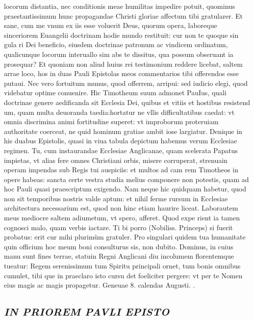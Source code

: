 \documentclass{article}
\begin{document}
\begin{pages}
locorum distantia, nec conditionis meae humilitas impedire potuit, quominus praestantissimum hunc propagandae Christi gloriae affectum tibi gratularer. Et sane, cum me vnum ex iis esse voluerit Deus, quorum opera, laboreque sinceriorem Euangelii doctrinam hodie mundo restituit: cur non te quoque sin gula ri Dei beneficio, eiusdem doctrinae patronum ac vindicem ordinatum, qualicunque locorum interuallo sim abs te dissitus, qua possum obseruant ia prosequar? Et quoniam non aliud huius rei testimonium reddere licebat, saltem arrae loco, hos in duas Pauli Epistolas meos commentarios tibi offerendos esse putaui. Nec vero fortuitum munus, quod offerrem, arripui: sed iudicio elegi, quod videbatur optime conuenire. Hic Timotheum suum admonet PauIus, quali doctrinae genere aedificanda sit Ecclesia Dei, quibus et vitiis et hostibus resistend um, quam multa deuoranda taedia:hortatur ne vllis difficultatibus caedat: vt omnia discrimina animi fortitudine superet: vt improborum proteruiam authoritate coerceat, ne quid hominum gratiae ambit iose largiatur. Denique in his duabus Epistolis, quasi in viua tabula depictum habemus verum Ecclesiae regi\pend\pstart men. Tu, cum instaurandae Ecclesiae Anglicanae, quam scelerata Papatus impietas, vt alias fere omnes Christiani orbis, misere corruperat, strenuain operam impendas sub Regis tui auspiciis: et multos ad cam rem Timotheos in opere habeas: sancta certe vestra studia melius componere non potestis, quam ad hoc Pauli quasi praescriptum exigendo. Nam neque hic quidquam habetur, quod non sit temporibus nostris valde aptum: et nihil ferme rursum in Ecclesiae architectura necessarium est, quod non hinc etiam haurire liceat. Laborautem meus mediocre saltem adiumetum, vt spero, afferet. Quod expe rient ia tamen cognosci malo, quam verbis iactare. Ti bi porro (Nobiliss. Princeps) si fuerit probatus: erit cur mihi plurimùm gratuler. Pro singulari quidem tua humanitate quin officium hoc meum boni consulturus sis, non dubito. Dominus, in cuius manu sunt fines terrae, statuin Regni Anglicani diu incolumem florentemque tueatur: Regem serenissimum tum Spiritu principali ornet, tum bonis omnibus cumulet, tibi que in praeclaro isto cursu det foeliciter pergere: vt per te Nomen eius magis ac magis propagetur.  \pend\pstart Geneuae 8. calendas Augusti.  \pend{}.  \pend
{}
{}
\subsection*{\textit{IN PRIOREM PAVLI EPISTO}}
{}

\end{pages}
\end{document}
